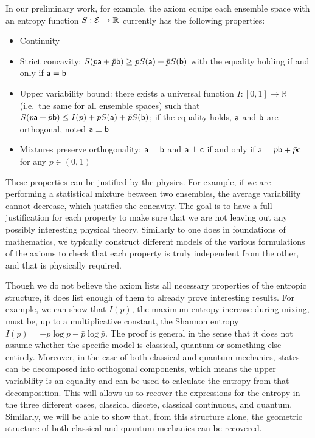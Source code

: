 In our preliminary work, for example, the axiom equips each ensemble space with an entropy function $S : \Ens \to \mathbb{R}$ currently has the following properties:
\begin{itemize}
	\item Continuity
	\item Strict concavity: $S(p\ens[a] + \bar{p} \ens[b]) \geq p S(\ens[a]) + \bar{p} S(\ens[b])$ with the equality holding if and only if $\ens[a] = \ens[b]$
	\item Upper variability bound: there exists a universal function $I : [0,1] \to \mathbb{R}$ (i.e.~the same for all ensemble spaces) such that $S(p\ens[a] + \bar{p} \ens[b]) \leq I(p) + p S(\ens[a]) + \bar{p} S(\ens[b])$; if the equality holds, $\ens[a]$ and $\ens[b]$ are orthogonal, noted $\ens[a] \ortho \ens[b]$
	\item Mixtures preserve orthogonality: $\ens[a] \ortho \ens[b]$ and $\ens[a] \ortho \ens[c]$ if and only if $\ens[a] \ortho p \ens[b] + \bar{p} \ens[c]$ for any $p \in (0,1)$
\end{itemize}
These properties can be justified by the physics. For example, if we are performing a statistical mixture between two ensembles, the average variability cannot decrease, which justifies the concavity. The goal is to have a full justification for each property to make sure that we are not leaving out any possibly interesting physical theory. Similarly to one does in foundations of mathematics, we typically construct different models of the various formulations of the axioms to check that each property is truly independent from the other, and that is physically required.

Though we do not believe the axiom lists all necessary properties of the entropic structure, it does list enough of them to already prove interesting results. For example, we can show that $I(p)$, the maximum entropy increase during mixing, must be, up to a multiplicative constant, the Shannon entropy~\cite{Shannon} $I(p)= - p \log p - \bar{p} \log \bar{p}$. The proof is general in the sense that it does not assume whether the specific model is classical, quantum or something else entirely. Moreover, in the case of both classical and quantum mechanics, states can be decomposed into orthogonal components, which means the upper variability is an equality and can be used to calculate the entropy from that decomposition. This will allows us to recover the expressions for the entropy in the three different cases, classical discete, classical continuous, and quantum. Similarly, we will be able to show that, from this structure alone, the geometric structure of both classical and quantum mechanics can be recovered.

